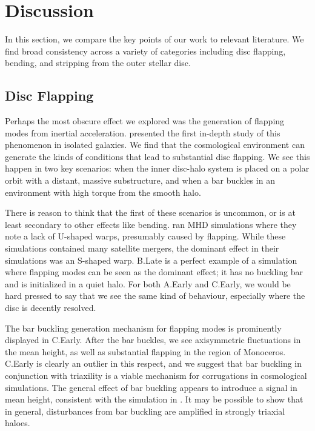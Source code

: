 \section{Discussion} \label{sec:discussion}

In this section, we compare the key points of our work to relevant literature. We find broad consistency across a variety of categories including disc flapping, bending, and stripping from the outer stellar disc.

\subsection{Disc Flapping}

Perhaps the most obscure effect we explored was the generation of flapping modes from inertial acceleration. \citet{sellwood_1996} presented the first in-depth study of this phenomenon in isolated galaxies. We find that the cosmological environment can generate the kinds of conditions that lead to substantial disc flapping. We see this happen in two key scenarios: when the inner disc-halo system is placed on a polar orbit with a distant, massive substructure, and when a bar buckles in an environment with high torque from the smooth halo. 

There is reason to think that the first of these scenarios is uncommon, or is at least secondary to other effects like bending. \citet{gomez_2017} ran MHD simulations where they note a lack of U-shaped warps, presumably caused by flapping. While these simulations contained many satellite mergers, the dominant effect in their simulations was an S-shaped warp. B.Late is a perfect example of a simulation where flapping modes can be seen as the dominant effect; it has no buckling bar and is initialized in a quiet halo. For both A.Early and C.Early, we would be hard pressed to say that we see the same kind of behaviour, especially where the disc is decently resolved.

The bar buckling generation mechanism for flapping modes is prominently displayed in C.Early. After the bar buckles, we see axisymmetric fluctuations in the mean height, as well as substantial flapping in the region of Monoceros. C.Early is clearly an outlier in this respect, and we suggest that bar buckling in conjunction with triaxility is a viable mechanism for corrugations in cosmological simulations. The general effect of bar buckling appears to introduce a signal in mean height, consistent with the simulation in \citet{bar_buckling_echo}. It may be possible to show that in general, disturbances from bar buckling are amplified in strongly triaxial haloes.

